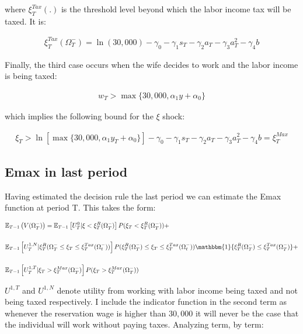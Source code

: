 \documentclass[11pt]{article}
\begin{document}
where $\xi_T^{Tax}(.)$ is the threshold level beyond which the labor income tax will be taxed. It is:

\begin{align}\label{eq:xitax}
	\xi_T^{Tax}(\Omega_T^-)=\ln(30,000)-\gamma_0-\gamma_1s_T-\gamma_2a_{T}-\gamma_3a_{T}^2-\gamma_4b
\end{align}


Finally, the third case occurs when the wife decides to work and the labor income is being taxed:

\begin{align}
	w_T>\max\{30,000,\alpha_1y+\alpha_0\}
\end{align}


which implies the following bound for the $\xi$ shock:

\begin{align}\label{eq:work tax}
	\xi_T>\ln\left[ \max\{30,000,\alpha_1y_T+\alpha_0\} \right]-\gamma_0-\gamma_1s_T-\gamma_2a_{T}-\gamma_3a_{T}^2
-\gamma_4b=\xi_T^{Max}
\end{align}



\subsection{Emax in last period}

Having estimated the decision rule the last period we can estimate the Emax function at period T. This takes the form:

\begin{align}
	& \mathbb{E}_{T-1}\left(V(\Omega_T^-) \right)=\mathbb{E}_{T-1}\left[U_T^{0}| \xi<\xi_T^R(\Omega_T^-) \right]P(\xi_T<\xi_T^R(\Omega_T^-) )+\nonumber \\[0.2in]
	& \mathbb{E}_{T-1}\left[U_T^{1,N}| \xi_T^R(\Omega_T^-\leq \xi_T\leq \xi_T^{Tax}(\Omega_t^-)) \right]P(\xi_T^R(\Omega_T^-)\leq \xi_T\leq \xi_T^{Tax}(\Omega_t^-)) \mathbbm{1}\{\xi_T^R(\Omega_T^-)\leq\xi_T^{Tax}(\Omega_T^-)\}+\nonumber \\[0.2in]
	& \mathbb{E}_{T-1}\left[U_T^{1,T}| \xi_T>\xi_T^{Max}(\Omega_T^-) \right]P(\xi_T>\xi_T^{Max}(\Omega_T^-))
\end{align}

$U^{1,T}$ and $U^{1,N}$ denote utility from working with labor income being taxed and not being taxed respectively. I include the indicator function in the second term as whenever the reservation wage is higher than $30,000$ it will never be the case that the individual will work without paying taxes. Analyzing term, by term:
\end{document}
